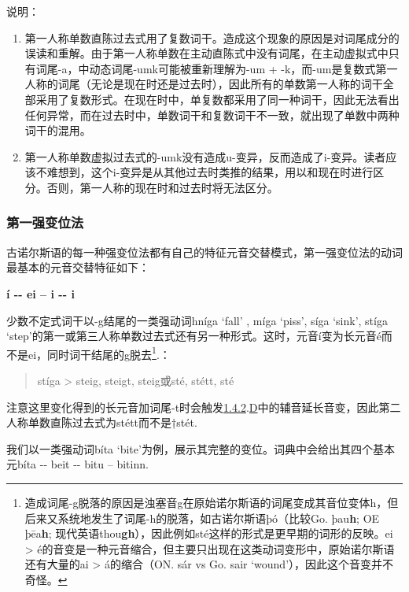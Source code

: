 说明：

\begin{enumerate}
  \def\labelenumi{\arabic{enumi})}
  \item
        \label{_Ref117719619}{}第一人称单数直陈过去式用了复数词干。造成这个现象的原因是对词尾成分的误读和重解。由于第一人称单数在主动直陈式中没有词尾，在主动虚拟式中只有词尾-a，中动态词尾-umk可能被重新理解为-um
        +
        -k，而-um是复数式第一人称的词尾（无论是现在时还是过去时），因此所有的单数第一人称的词干全部采用了复数形式。在现在时中，单复数都采用了同一种词干，因此无法看出任何异常，而在过去时中，单数词干和复数词干不一致，就出现了单数中两种词干的混用。
  \item
        第一人称单数虚拟过去式的-umk没有造成u-变异，反而造成了i-变异。读者应该不难想到，这个i-变异是从其他过去时类推的结果，用以和现在时进行区分。否则，第一人称的现在时和过去时将无法区分。
\end{enumerate}

\subsubsection{第一强变位法}\label{ux7b2cux4e00ux5f3aux53d8ux4f4dux6cd5}

古诺尔斯语的每一种强变位法都有自己的特征元音交替模式，第一强变位法的动词最基本的元音交替特征如下：

\textbf{í -\/- ei -- i -\/- i}

少数不定式词干以-g结尾的一类强动词hníga `fall' , míga `piss', síga
`sink', stíga
`step'的第一或第三人称单数过去式还有另一种形式。这时，元音í变为长元音é而不是ei，同时词干结尾的g脱去\footnote{造成词尾-g脱落的原因是浊塞音g在原始诺尔斯语的词尾变成其音位变体h，但后来又系统地发生了词尾-h的脱落，如古诺尔斯语þó（比较Go.
  þau\textbf{h}; OE þēa\textbf{h};
  现代英语thou\textbf{gh}），因此例如sté这样的形式是更早期的词形的反映。ei
  \textgreater{}
  é的音变是一种元音缩合，但主要只出现在这类动词变形中，原始诺尔斯语还有大量的ai
  \textgreater{} á的缩合（ON. sár vs Go. sair
  `wound'），因此这个音变并不奇怪。}.：

\begin{quote}
  stíga \textgreater{} steig, steigt, steig或sté, stétt, sté
\end{quote}

注意这里变化得到的长元音加词尾-t时会触发\hyperref[ux8f85ux97f3ux7684ux97f3ux53d8]{1.4.2}.\hyperref[_Ref116211616]{D}中的辅音延长音变，因此第二人称单数直陈过去式为stétt而不是†stét.

我们以一类强动词bíta
`bite'为例，展示其完整的变位。词典中会给出其四个基本元bíta -\/- beit
-\/- bitu -- bitinn.

